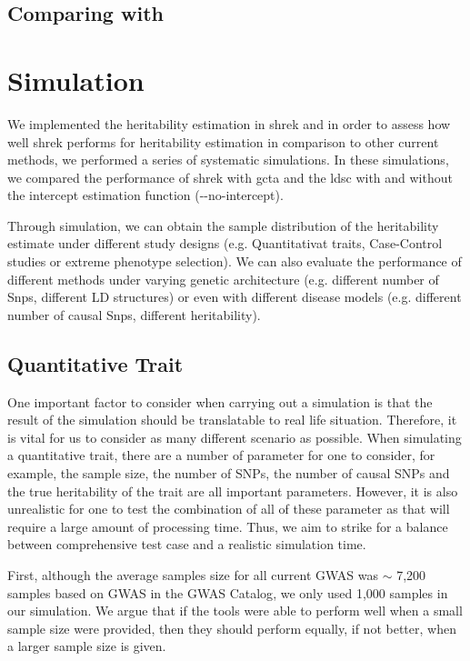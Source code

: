 		\subsection{Comparing with }
	
		
	\section{Simulation}
		We implemented the heritability estimation in \gls{shrek} and in order to assess how well \gls{shrek} performs for heritability estimation in comparison to other current methods, we performed a series of systematic simulations.
		In these simulations, we compared the performance of \gls{shrek} with \gls{gcta}\citep{Yang2011} and the \gls{ldsc}\citep{Bulik-Sullivan2015} with and without the intercept estimation function (-{}-no-intercept). 
		
		Through simulation, we can obtain the sample distribution of the heritability estimate under different study designs (e.g. Quantitativat traits, Case-Control studies or extreme phenotype selection). 
		We can also evaluate the performance of different methods under varying genetic architecture (e.g. different number of Snps, different LD structures) or even with different disease models (e.g. different number of causal Snps, different heritability).
		
		\subsection{Quantitative Trait}
			One important factor to consider when carrying out a simulation is that the result of the simulation should be translatable to real life situation. 
			Therefore, it is vital for us to consider as many different scenario as possible.
			When simulating a quantitative trait, there are a number of parameter for one to consider, for example, the sample size, the number of \glspl{SNP}, the number of causal \glspl{SNP} and the true heritability of the trait are all important parameters. 
			However, it is also unrealistic for one to test the combination of all of these parameter as that will require a large amount of processing time. 
			Thus, we aim to strike for a balance between comprehensive test case and a realistic simulation time. 
			
			First, although the average samples size for all current \gls{GWAS} was $\sim$ 7,200 samples based on \gls{GWAS} in the \gls{GWAS} Catalog\citep{Welter2014}, we only used 1,000 samples in our simulation.
			We argue that if the tools were able to perform well when a small sample size were provided, then they should perform equally, if not better, when a larger sample size is given. 
			
